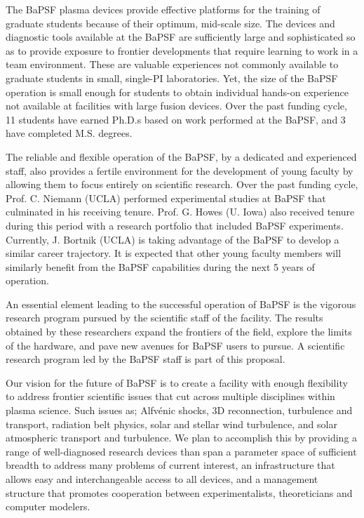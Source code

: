 \documentclass[11pt]{article}
\begin{document}
The BaPSF plasma devices provide effective platforms for the training
of graduate students because of their optimum, mid-scale size. The
devices and diagnostic tools available at the BaPSF are sufficiently
large and sophisticated so as to provide exposure to frontier
developments that require learning to work in a team
environment. These are valuable experiences not commonly available to
graduate students in small, single-PI laboratories. Yet, the size of
the BaPSF operation is small enough for students to obtain individual
hands-on experience not available at facilities with large fusion
devices. Over the past funding cycle, 11 students have earned Ph.D.s
based on work performed at the BaPSF, and 3 have completed
M.S. degrees.

The reliable and flexible operation of the BaPSF, by a dedicated and
experienced staff, also provides a fertile environment for the
development of young faculty by allowing them to focus entirely on
scientific research. Over the past funding cycle, Prof. C. Niemann
(UCLA) performed experimental studies at BaPSF that culminated in his
receiving tenure. Prof. G. Howes (U. Iowa) also received tenure during
this period with a research portfolio that included BaPSF experiments.
Currently, J. Bortnik (UCLA) is taking advantage of the BaPSF to develop
a similar career trajectory. It is expected that other young faculty
members will similarly benefit from the BaPSF capabilities during the
next 5 years of operation.

An essential element leading to the successful operation of BaPSF is the
vigorous research program pursued by the scientific staff of the
facility. The results obtained by these researchers expand the frontiers
of the field, explore the limits of the hardware, and pave new avenues
for BaPSF users to pursue. A scientific research program led by the BaPSF staff is part of
this proposal.  

Our vision for the future of BaPSF is to create a facility with enough
flexibility to address frontier scientific issues that cut across
multiple disciplines within plasma science. Such issues as; Alfvénic
shocks, 3D reconnection, turbulence and transport, radiation belt
physics, solar and stellar wind turbulence, and solar atmospheric
transport and turbulence. We plan to accomplish this by providing a
range of well-diagnosed research devices than span a parameter space
of sufficient breadth to address many problems of current interest, an
infrastructure that allows easy and interchangeable access to all
devices, and a management structure that promotes cooperation between
experimentalists, theoreticians and computer modelers.
\end{document}
